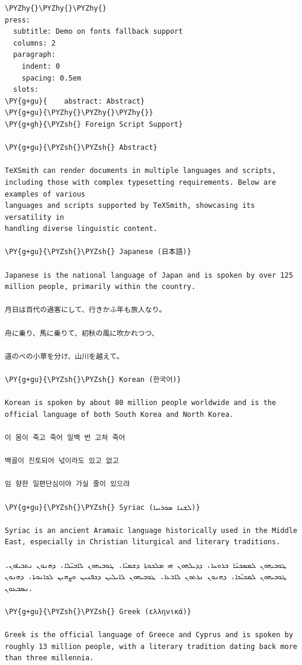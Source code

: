 \documentclass[a4paper,twoside]{article}
\begin{document}
\begin{tscode}[lang=markdown, engine=pygments]
\begin{Verbatim}[commandchars=\\\{\},breaklines, breakanywhere, commandchars=\\\{\}]
\PYZhy{}\PYZhy{}\PYZhy{}
press:
  subtitle: Demo on fonts fallback support
  columns: 2
  paragraph:
    indent: 0
    spacing: 0.5em
  slots:
\PY{g+gu}{    abstract: Abstract}
\PY{g+gu}{\PYZhy{}\PYZhy{}\PYZhy{}}
\PY{g+gh}{\PYZsh{} Foreign Script Support}

\PY{g+gu}{\PYZsh{}\PYZsh{} Abstract}

TeXSmith can render documents in multiple languages and scripts, including those with complex typesetting requirements. Below are examples of various
languages and scripts supported by TeXSmith, showcasing its versatility in
handling diverse linguistic content.

\PY{g+gu}{\PYZsh{}\PYZsh{} Japanese (日本語)}

Japanese is the national language of Japan and is spoken by over 125 million people, primarily within the country.

月日は百代の過客にして、行きかふ年も旅人なり。

舟に乗り、馬に乗りて、初秋の風に吹かれつつ、

道のべの小草を分け、山川を越えて。

\PY{g+gu}{\PYZsh{}\PYZsh{} Korean (한국어)}

Korean is spoken by about 80 million people worldwide and is the official language of both South Korea and North Korea.

이 몸이 죽고 죽어 일백 번 고쳐 죽어

백골이 진토되어 넋이라도 있고 없고

임 향한 일편단심이야 가실 줄이 있으랴

\PY{g+gu}{\PYZsh{}\PYZsh{} Syriac (ܠܫܢܐ ܣܘܪܝܝܐ)}

Syriac is an ancient Aramaic language historically used in the Middle East, especially in Christian liturgical and literary traditions.

ܛܘܒܝܗܘܢ ܠܡܣܟܢ̈ܐ ܒܪܘܚܐ، ܕܕܝܠܗܘܢ ܗܝ ܡܠܟܘܬܐ ܕܫܡܝ̈ܐ. ܛܘܒܝܗܘܢ ܠܐܒܝ̈ܠܐ، ܕܗܢܘܢ ܢܬܒܝܐܘܢ. ܛܘܒܝܗܘܢ ܠܡܟܝ̈ܟܐ، ܕܗܢܘܢ ܢܪܬܘܢ ܠܐܪܥܐ. ܛܘܒܝܗܘܢ ܠܐܝܠܝܢ ܕܟܦܢܝܢ ܘܨܗܝܢ ܠܟܐܢܘܬܐ، ܕܗܢܘܢ ܢܣܒܥܘܢ.

\PY{g+gu}{\PYZsh{}\PYZsh{} Greek (ελληνικά)}

Greek is the official language of Greece and Cyprus and is spoken by roughly 13 million people, with a literary tradition dating back more than three millennia.


\end{Verbatim}
\end{tscode}
\end{document}
